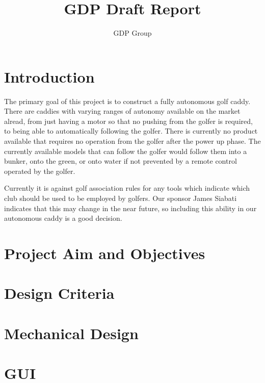 \documentclass[11pt,landscape]{article}
\title{GDP Draft Report}
\author{GDP Group}
\begin{document}
\maketitle
\newpage
\begin{multicols}{3}
\tableofcontents
\newpage
\section{Introduction}
The primary goal of this project is to construct a fully autonomous golf caddy.
There are caddies with varying ranges of autonomy available on the market
alread, from just having a motor so that no pushing from the golfer is required,
to being able to automatically following the golfer. There is currently no
product available that requires no operation from the golfer after the power up
phase. The currently available models that can follow the golfer would follow
them into a bunker, onto the green, or onto water if not prevented by a remote
control operated by the golfer.

Currently it is against golf association rules for any tools which indicate
which club should be used to be employed by golfers. Our sponsor James Siabati
indicates that this may change in the near future, so including this ability in
our autonomous caddy is a good decision.
\section{Project Aim and Objectives}
\section{Design Criteria}
\section{Mechanical Design}
\section{GUI}


\end{multicols}
\end{document}

